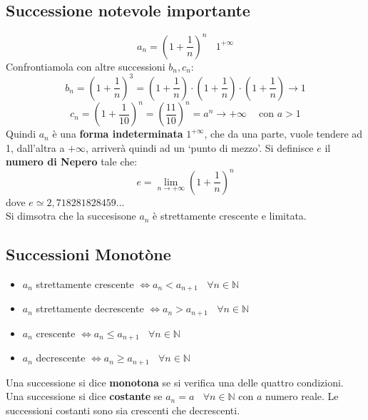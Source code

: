 \documentclass{article}
\begin{document}
\subsection{Successione notevole importante}
\[
    a_n = (1+\dfrac{1}{n})^n \ \ \ \ 1^{+\infty}
\]
Confrontiamola con altre successioni $b_n, c_n$:
\[
    b_n = (1+\dfrac{1}{n})^3 = (1+\dfrac{1}{n})\cdot(1+\dfrac{1}{n})\cdot(1+\dfrac{1}{n})\to 1
\]
\[
    c_n = (1+\dfrac{1}{10})^n = (\dfrac{11}{10})^n = a^n \to +\infty \ \ \ \ \text{ con } a > 1
\]
Quindi $a_n$ è una \textbf{forma indeterminata} $1^{+\infty}$, che da una
parte, vuole tendere ad 1, dall'altra a $+\infty$, arriverà quindi ad un `punto
di mezzo'. Si definisce $e$ il \textbf{numero di Nepero} tale che:
\[
    e = \lim_{n\to+\infty}(1+\dfrac{1}{n})^n
\]
dove $e \simeq 2,718281828459\ldots$\\ Si dimsotra che la succesisone $a_n$ è
strettamente crescente e limitata.

\subsection{Successioni Monotòne}
\begin{itemize}
    \item $a_n$ strettamente crescente $\iff a_n < a_{n+1} \ \ \ \ \forall n \in \mathbb{N}$
    \item $a_n$ strettamente decrescente $\iff a_n > a_{n+1} \ \ \ \ \forall n \in \mathbb{N}$
    \item $a_n$ crescente $\iff a_n \leq a_{n+1} \ \ \ \ \forall n \in \mathbb{N}$
    \item $a_n$ decrescente $\iff a_n \geq a_{n+1} \ \ \ \ \forall n \in \mathbb{N}$
\end{itemize}
Una successione si dice \textbf{monotona} se si verifica una delle quattro condizioni.\\
Una successione si dice \textbf{costante} se $a_n = a \ \ \ \ \forall n \in \mathbb{N}$ con $a$ numero reale. Le successioni costanti sono sia crescenti che decrescenti.
\end{document}
